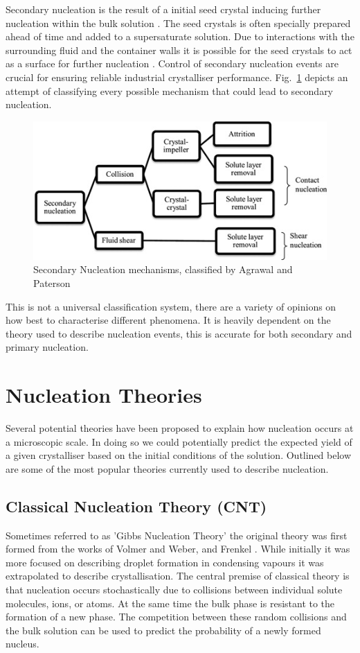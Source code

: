 Secondary nucleation is the result of a initial seed crystal 
inducing further nucleation within the bulk solution 
\cite{Botsaris1976}. The seed crystals is often specially 
prepared ahead of time and added to a supersaturate solution. 
Due to interactions with the surrounding fluid and the container 
walls it is possible for the seed crystals to act as a surface
for further nucleation \cite{Anwar2015}. Control of secondary 
nucleation events are crucial for ensuring reliable industrial 
crystalliser performance. Fig.~\ref{fig:secondary} depicts an 
attempt of classifying every possible mechanism that could lead 
to secondary nucleation.
\begin{figure}[h!]
	\centering
	\includegraphics[width=0.95\linewidth]{secondary_nucleation.jpg}
	\caption{Secondary Nucleation mechanisms, classified by
		Agrawal and Paterson \cite{Agrawal2015}}
	\label{fig:secondary}
\end{figure}

This is not a universal classification system, there are a 
variety of opinions on how best to characterise different 
phenomena. It is heavily dependent on the theory used to 
describe nucleation events, this is accurate for both 
secondary and primary nucleation.

\section{Nucleation Theories}
Several potential theories have been proposed to explain 
how nucleation occurs at a microscopic scale. In doing so 
we could potentially predict the expected yield of a given
crystalliser based on the initial conditions of the solution. 
Outlined below are some of the most popular theories currently 
used to describe nucleation. 

\subsection{Classical Nucleation Theory (CNT)}
Sometimes referred to as 'Gibbs Nucleation Theory' the 
original theory was first formed from the works of Volmer 
and Weber, and Frenkel \cite{Frenkel1939, Volmer1926}. 
While initially it was more focused on describing droplet
formation in condensing vapours it was extrapolated to 
describe crystallisation. The central premise of classical 
theory is that nucleation occurs stochastically due to 
collisions between individual solute molecules, ions, or 
atoms. At the same time the bulk phase is resistant to the
formation of a new phase. The competition between these 
random collisions and the bulk solution can be used to 
predict the probability of a newly formed nucleus.
 
